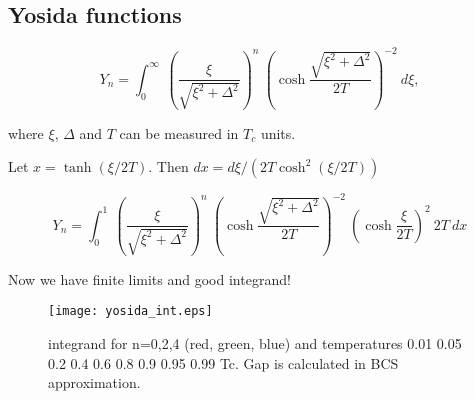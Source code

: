 \documentclass[a4paper]{article}
\begin{document}
\subsection*{Yosida functions}

$$
Y_n = \int_0^\infty
  \ \left(\frac{\xi}{\sqrt{\xi^2+\Delta^2}}\right)^n
  \ \left(\cosh \frac{\sqrt{\xi^2+\Delta^2}}{2T}\right)^{-2}
  \ d\xi,
$$

where $\xi$, $\Delta$ and $T$ can be measured in $T_c$ units.

Let $x = \tanh(\xi/2T)$. Then $dx = d\xi/(2T\cosh^2(\xi/2T))$

$$
Y_n = \int_0^1
  \ \left(\frac{\xi}{\sqrt{\xi^2+\Delta^2}}\right)^n
  \ \left(\cosh \frac{\sqrt{\xi^2+\Delta^2}}{2T}\right)^{-2}
  \ \left(\cosh\frac{\xi}{2T}\right)^2\ 2T \ dx
$$

Now we have finite limits and good integrand!

\begin{figure}[h]
\texttt{[image: yosida\_int.eps]}
\caption{integrand for n=0,2,4 (red, green, blue) and temperatures
0.01 0.05 0.2 0.4 0.6 0.8 0.9 0.95 0.99 Tc. Gap is calculated in BCS
approximation.}
\end{figure}
\end{document}
